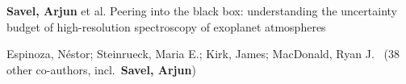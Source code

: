 


\item[{\color{numcolor}\scriptsize4}] \textbf{Savel, Arjun} et al. Peering into the black box: understanding the uncertainty budget of high-resolution spectroscopy of exoplanet atmospheres
\item[{\color{numcolor}\scriptsize3}] Espinoza, Néstor; Steinrueck, Maria E.; Kirk, James; MacDonald, Ryan J. \etal\ ({38} other co-authors, incl.\ \textbf{Savel, Arjun})